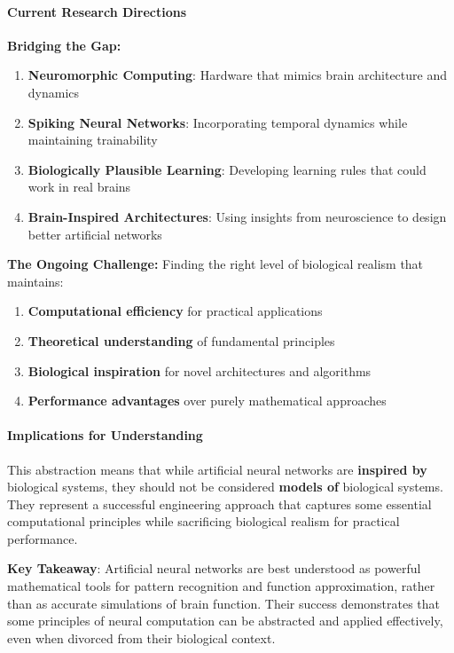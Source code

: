 \paragraph{Current Research Directions}
\label{para:current-research-directions}

\textbf{Bridging the Gap:}

\begin{enumerate}
\item \textbf{Neuromorphic Computing}: Hardware that mimics brain architecture and dynamics
\item \textbf{Spiking Neural Networks}: Incorporating temporal dynamics while maintaining trainability
\item \textbf{Biologically Plausible Learning}: Developing learning rules that could work in real brains
\item \textbf{Brain-Inspired Architectures}: Using insights from neuroscience to design better artificial networks
\end{enumerate}

\textbf{The Ongoing Challenge:}
Finding the right level of biological realism that maintains:

\begin{enumerate}
\item \textbf{Computational efficiency} for practical applications
\item \textbf{Theoretical understanding} of fundamental principles
\item \textbf{Biological inspiration} for novel architectures and algorithms
\item \textbf{Performance advantages} over purely mathematical approaches
\end{enumerate}

\paragraph{Implications for Understanding}
\label{para:implications-understanding}

This abstraction means that while artificial neural networks are \textbf{inspired by} biological systems, they should not be considered \textbf{models of} biological systems. They represent a successful engineering approach that captures some essential computational principles while sacrificing biological realism for practical performance.

\textbf{Key Takeaway}: Artificial neural networks are best understood as powerful mathematical tools for pattern recognition and function approximation, rather than as accurate simulations of brain function. Their success demonstrates that some principles of neural computation can be abstracted and applied effectively, even when divorced from their biological context.